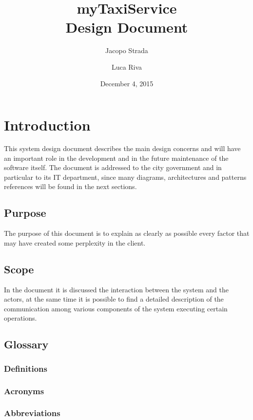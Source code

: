 \documentclass[a4paper]{article}
\title{{\Huge myTaxiService} \\ Design Document}
\author{Jacopo Strada \and Luca Riva}
\date{December 4, 2015}
\let\stdsection\section
\renewcommand\section{\newpage\stdsection}
\begin{document}
\maketitle

\newpage

\tableofcontents

\listoffigures 

\listoftables

\setlength{\parindent}{0em}
\setlength{\parskip}{1em}

\section{Introduction}
This system design document describes the main design concerns and will have an important role in the development and in the future maintenance of the software itself. The document is addressed to the city government and in particular to its IT department, since many diagrams, architectures and patterns references will be found in the next sections.

\subsection{Purpose}
The purpose of this document is to explain as clearly as possible every factor that may have created some perplexity in the client.

\subsection{Scope}
In the document it is discussed the interaction between the system and the actors, at the same time it is possible to find a detailed description of the communication among various components of the system executing certain operations.
\subsection{Glossary}
\subsubsection{Definitions}
\subsubsection{Acronyms}
\subsubsection{Abbreviations}
\end{document}

